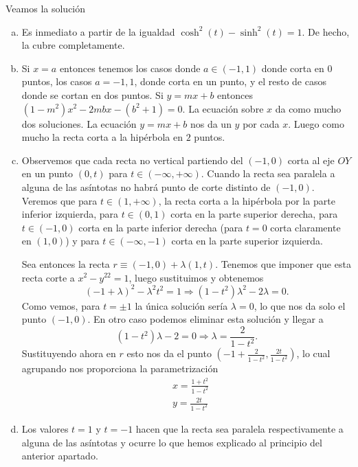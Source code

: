 \documentclass[twoside]{article}
\begin{document}
\begin{solucion}
Veamos la solución
\begin{enumerate}[a)]
\item Es inmediato a partir de la igualdad $\cosh^2(t)
-\sinh^2(t)=1$. De hecho, la cubre completamente.
\item Si $x=a$ entonces tenemos los casos donde $a\in(-1,1)$ donde corta en 0 puntos, los casos $a=-1,1$, donde corta en un punto, y el resto de casos donde se cortan en dos puntos. Si $y=mx+b$ entonces $(1-m^2)x^2-2mbx-(b^2+1)=0$. La ecuación sobre $x$ da como mucho dos soluciones. La ecuación $y=mx+b$ nos da un $y$ por cada $x$. Luego como mucho la recta corta a la hipérbola en $2$ puntos.
\item Observemos que cada recta no vertical partiendo del $(-1,0)$ corta al eje $OY$ en un punto $(0,t)$ para $t\in(-\infty,+\infty)$. Cuando la recta sea paralela a alguna de las asíntotas no habrá punto de corte distinto de $(-1,0)$. Veremos que para $t\in(1,+\infty)$, la recta corta a la hipérbola por la parte inferior izquierda, para $t\in(0,1)$ corta en la parte superior derecha, para $t\in (-1,0)$ corta en la parte inferior derecha (para $t=0$ corta claramente en $(1,0)$) y para $t\in (-\infty,-1)$ corta en la parte superior izquierda.

Sea entonces la recta $r\equiv (-1,0)+\lambda (1,t)$. Tenemos que imponer que esta recta corte a $x^2-y^22=1$, luego sustituimos y obtenemos
\[
(-1+\lambda)^2-\lambda^2t^2=1\Rightarrow (1-t^2)\lambda^2-2\lambda=0.
\]
Como vemos, para $t=\pm 1$ la única solución sería $\lambda=0$, lo que nos da solo el punto $(-1,0)$. En otro caso podemos eliminar esta solución y llegar a 
\[
(1-t^2)\lambda-2=0\Rightarrow \lambda= \frac{2}{1-t^2}.
\]
Sustituyendo ahora en $r$ esto nos da el punto $(-1+\frac{2}{1-t^2}, \frac{2t}{1-t^2})$, lo cual agrupando nos proporciona la parametrización
\begin{align*}
&x=\frac{1+t^2}{1-t^2}\\
&y= \frac{2t}{1-t^2}
\end{align*}
\item Los valores $t=1$ y $t=-1$ hacen que la recta sea paralela respectivamente a alguna de las asíntotas y ocurre lo que hemos explicado al principio del anterior apartado.
\end{enumerate}
\end{solucion}
\end{document}
